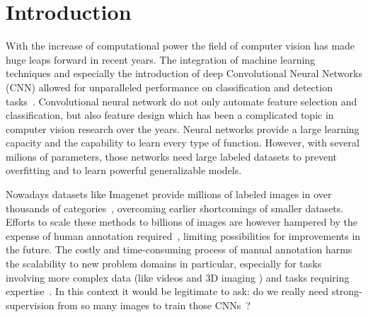 %

% 

\chapter{Introduction}
With the increase of computational power the field of computer vision has made huge leaps forward in recent years. The integration of machine learning techniques and especially the introduction of deep Convolutional Neural Networks (CNN) allowed for unparalleled performance on classification and detection tasks~\cite{krizhevsky2012}. Convolutional neural network do not only automate feature selection and classification, but also feature design which has been a complicated topic in computer vision research over the years\needref. Neural networks provide a large learning capacity and the capability to learn every type of function. However, with several milions of parameters, those networks need large labeled datasets to prevent overfitting and to learn powerful generalizable models.

Nowadays datasets like Imagenet provide millions of labeled images in over thousands of categories~\cite{deng2009}, overcoming earlier shortcomings of smaller datasets. Efforts to scale these methods to billions of images are however hampered by the expense of human annotation required~\cite{doersch2015}, limiting possibilities for improvements in the future. The costly and time-consuming process of manual annotation harms the scalability to new problem domains in particular, especially for tasks involving more complex data (like videos and 3D imaging \needref) and tasks requiring expertise~\cite{lee2017,fernando2017}. In this context it would be legitimate to ask: do we really need strong-supervision from so many images to train those CNNs~\cite{wang2015}?

